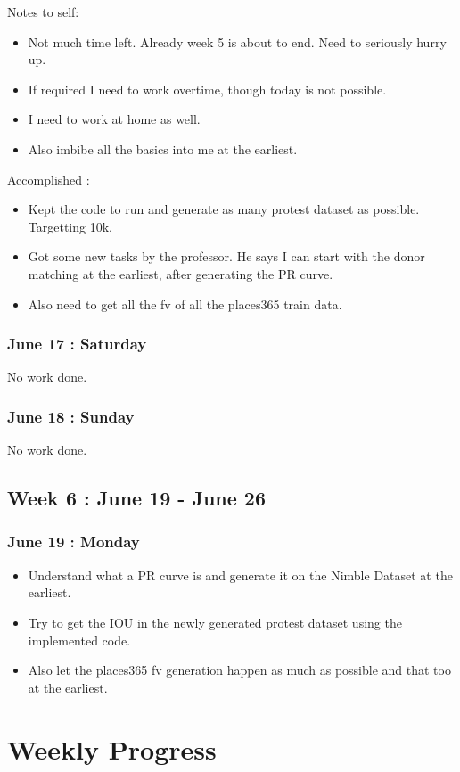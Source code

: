 \documentclass{article}
\begin{document}
Notes to self:
\begin{itemize}
\item Not much time left. Already week 5 is about to end. Need to seriously hurry up.
\item If required I need to work overtime, though today is not possible.
\item I need to work at home as well.
\item Also imbibe all the basics into me at the earliest.
\end{itemize}

Accomplished :
\begin{itemize}
\item Kept the code to run and generate as many protest dataset as possible. Targetting 10k.
\item Got some new tasks by the professor. He says I can start with the donor matching at the earliest, after generating the PR curve. 
\item Also need to get all the fv of all the places365 train data. 
\end{itemize}

\subsubsection{June 17 : Saturday}
No work done.

\subsubsection{June 18 : Sunday}
No work done.

\subsection{Week 6 : June 19 - June 26}
\subsubsection{June 19 : Monday}
\begin{itemize}
\item Understand what a PR curve is and generate it on the Nimble Dataset at the earliest.
\item Try to get the IOU in the newly generated protest dataset using the implemented code.
\item Also let the places365 fv generation happen as much as possible and that too at the earliest.
\end{itemize}
\section{Weekly Progress}
\end{document}
